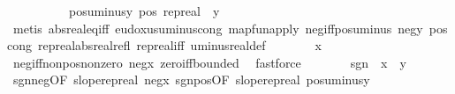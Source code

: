 \begin{isabellebody}
\ \ \isamarkupfalse%
\ {\isacharminus}{\kern0pt}\isanewline
\ \ \ \ \isamarkupfalse%
\ pos{\isacharunderscore}{\kern0pt}uminus{\isacharunderscore}{\kern0pt}y{\isacharcolon}{\kern0pt}\ {\isachardoublequoteopen}pos\ {\isacharparenleft}{\kern0pt}rep{\isacharunderscore}{\kern0pt}real\ {\isacharparenleft}{\kern0pt}{\isacharminus}{\kern0pt}\ y{\isacharparenright}{\kern0pt}{\isacharparenright}{\kern0pt}{\isachardoublequoteclose}\ \isamarkupfalse%
\ {\isacharparenleft}{\kern0pt}metis\ abs{\isacharunderscore}{\kern0pt}real{\isacharunderscore}{\kern0pt}eq{\isacharunderscore}{\kern0pt}iff\ eudoxus{\isacharunderscore}{\kern0pt}uminus{\isacharunderscore}{\kern0pt}cong\ map{\isacharunderscore}{\kern0pt}fun{\isacharunderscore}{\kern0pt}apply\ neg{\isacharunderscore}{\kern0pt}iff{\isacharunderscore}{\kern0pt}pos{\isacharunderscore}{\kern0pt}uminus\ neg{\isacharunderscore}{\kern0pt}y\ pos{\isacharunderscore}{\kern0pt}cong\ rep{\isacharunderscore}{\kern0pt}real{\isacharunderscore}{\kern0pt}abs{\isacharunderscore}{\kern0pt}real{\isacharunderscore}{\kern0pt}refl\ rep{\isacharunderscore}{\kern0pt}real{\isacharunderscore}{\kern0pt}iff\ uminus{\isacharunderscore}{\kern0pt}real{\isacharunderscore}{\kern0pt}def{\isacharparenright}{\kern0pt}\isanewline
\ \ \ \ \isamarkupfalse%
\ \isamarkupfalse%
\ {\isachardoublequoteopen}x\ {\isasymnoteq}\ {}{\isachardoublequoteclose}\ \isamarkupfalse%
\ neg{\isacharunderscore}{\kern0pt}iff{\isacharunderscore}{\kern0pt}nonpos{\isacharunderscore}{\kern0pt}nonzero\ neg{\isacharunderscore}{\kern0pt}x\ zero{\isacharunderscore}{\kern0pt}iff{\isacharunderscore}{\kern0pt}bounded{\isacharprime}{\kern0pt}\ \isamarkupfalse%
\ fastforce\isanewline
\ \ \ \ \isamarkupfalse%
\ \isamarkupfalse%
\ {\isachardoublequoteopen}sgn\ {\isacharparenleft}{\kern0pt}{\isacharminus}{\kern0pt}\ {\isacharparenleft}{\kern0pt}x\ {\isacharasterisk}{\kern0pt}\ y{\isacharparenright}{\kern0pt}{\isacharparenright}{\kern0pt}\ {\isacharequal}{\kern0pt}\ {\isacharminus}{\kern0pt}\ {}{\isachardoublequoteclose}\ \isamarkupfalse%
\ sgn{\isacharunderscore}{\kern0pt}neg{\isacharbrackleft}{\kern0pt}OF\ slope{\isacharunderscore}{\kern0pt}rep{\isacharunderscore}{\kern0pt}real\ neg{\isacharunderscore}{\kern0pt}x{\isacharbrackright}{\kern0pt}\ sgn{\isacharunderscore}{\kern0pt}pos{\isacharbrackleft}{\kern0pt}OF\ slope{\isacharunderscore}{\kern0pt}rep{\isacharunderscore}{\kern0pt}real\ pos{\isacharunderscore}{\kern0pt}uminus{\isacharunderscore}{\kern0pt}y{\isacharbrackright}{\kern0pt}\ {\isacharasterisk}{\kern0pt}\ \isamarkupfalse%

\end{isabellebody}
